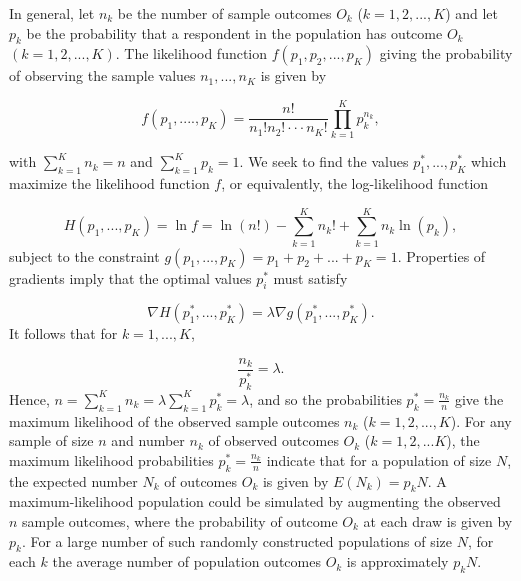 \documentclass[a4paper, 12pt]{article}
\begin{document}
In general, let $n_k$ be the number of sample outcomes $O_k$ ($k=1,2,...,K$) and let $p_k$ be the probability that a respondent in the population  has outcome $O_k$ $(k= 1, 2, ..., K)$.  The likelihood function $f(p_1, p_2, ..., p_K)$ giving the probability of observing the sample values $n_1, ..., n_{K}$ is given by

\begin{equation}
f(p_1, ...., p_K)= \frac{n!}{n_1!n_2!\cdot\cdot\cdot n_K!} \prod_{k=1}^K p_k^{n_k},
\end{equation}
\label{eq:4}

{\flushleft with} $\sum_{k=1}^{K}n_k=n$ and $\sum_{k=1}^{K}p_k=1$.
We seek to find the values $p_1^*, ..., p_{K}^*$ which maximize the likelihood function $f$, or equivalently, the log-likelihood function

\begin{equation}
H(p_1, ..., p_K)=\ln f = \ln(n!) - \sum_{k=1}^{K} n_k! +\sum_{k=1}^{K} n_k\ln(p_k),
\end{equation}
\label{eq:5}
{\flushleft subject} to the constraint $g(p_1, ..., p_{K})=p_1+p_2+...+p_K=1$.  Properties of gradients imply that the optimal values $p_i^*$ must satisfy

\begin{equation}
\nabla H(p_1^*, ..., p_K^*) = \lambda \nabla g(p_1^*, ..., p_{K}^*).
\end{equation}
\label{eq:6}
{\flushleft It} follows that for $k=1, ..., K$,

\begin{equation}
\frac{n_k}{p_k^*}=\lambda.
\end{equation}
\label{eq:7}
{\flushleft Hence,} $n=\sum_{k=1}^{K} n_k =  \lambda \sum_{k=1}^{K} p_k^* = \lambda$, and so the probabilities $p_k^* = \frac{n_k}{n}$ give the maximum likelihood of the observed sample outcomes $n_k$ ($k=1, 2, ..., K$).  For any sample of size $n$ and number $n_k$ of observed outcomes $O_k$ ($k=1, 2, ...K$), the maximum likelihood probabilities $p_k^*=\frac{n_k}{n}$
indicate that for a population of size $N$, the expected number $N_k$ of outcomes $O_k$ is given by $E(N_k)=p_k N.$  A maximum-likelihood population could be simulated by augmenting the observed $n$ sample outcomes, where the probability of outcome $O_k$ at each draw is given by $p_k$.   For a large number of such randomly constructed populations of size $N$, for each $k$ the average number of population outcomes $O_k$ is approximately $p_k N$.
\end{document}
